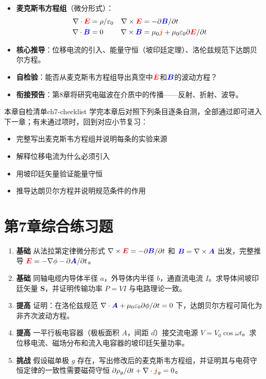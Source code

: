 \documentclass[11pt,a4paper,openany,oneside]{book}
\newcommand{\vecE}{\textcolor{red}{\vect{E}}}
\newcommand{\vecB}{\textcolor{blue}{\vect{B}}}
\newcommand{\vecJ}{\textcolor{cororange}{\vect{j}}}
\newcommand{\vecA}{\textcolor{blue!70!black}{\vect{A}}}
\newcommand{\eps}{\varepsilon}
\newcommand{\muz}{\mu_0}
\newcommand{\vect}[1]{\bm{#1}}
\newcommand{\curl}{\nabla\times}
\newcommand{\divg}{\nabla\cdot}
\begin{document}
\begin{chapterreview}
\begin{itemize}[nosep]
\item \textbf{麦克斯韦方程组}（微分形式）：\begin{align*}\divg\vecE&=\rho/\eps_0 & \curl\vecE&=-\partial\vecB/\partial t\\ \divg\vecB&=0 & \curl\vecB&=\muz\vecJ+\muz\eps_0\partial\vecE/\partial t\end{align*}
\item \textbf{核心推导}：位移电流的引入、能量守恒（坡印廷定理）、洛伦兹规范下达朗贝尔方程。
\item \textbf{自检验}：能否从麦克斯韦方程组导出真空中$\vecE$和$\vecB$的波动方程？
\item \textbf{衔接预告}：第8章将研究电磁波在介质中的传播——反射、折射、波导。
\end{itemize}
\end{chapterreview}

\begin{tip}{本章自检清单}{ch7-checklist}
学完本章后对照下列条目逐条自测，全部通过即可进入下一章；有未通过项时，回到对应小节复习：
\begin{itemize}[label=$\square$, nosep]
\item 完整写出麦克斯韦方程组并说明每条的实验来源
\item 解释位移电流为什么必须引入
\item 用坡印廷矢量验证能量守恒
\item 推导达朗贝尔方程并说明规范条件的作用
\end{itemize}
\end{tip}

\section*{第7章综合练习题}
\begin{enumerate}[label=\textbf{\arabic*.}]
\item \textbf{基础} 从法拉第定律微分形式 $\curl\vecE=-\partial\vecB/\partial t$ 和 $\vecB=\curl\vecA$ 出发，完整推导 $\vecE=-\nabla\phi-\partial\vecA/\partial t$。
\item \textbf{基础} 同轴电缆内导体半径 $a$，外导体内半径 $b$，通直流电流 $I$。求导体间坡印廷矢量 $\vect{S}$，并证明传输功率 $P=VI$ 与电路理论一致。
\item \textbf{提高} 证明：在洛伦兹规范 $\nabla\cdot\vecA+\muz\eps_0\partial\phi/\partial t=0$ 下，达朗贝尔方程可简化为非齐次波动方程。
\item \textbf{提高} 一平行板电容器（极板面积 $A$，间距 $d$）接交流电源 $V=V_0\cos\omega t$。求位移电流、磁场分布和流入电容器的坡印廷矢量功率。
\item \textbf{挑战} 假设磁单极 $g$ 存在，写出修改后的麦克斯韦方程组，并证明其与电荷守恒定律的一致性需要磁荷守恒 $\partial\rho_g/\partial t+\nabla\cdot\vecJ_g=0$。
\end{enumerate}
\newpage
\end{document}

